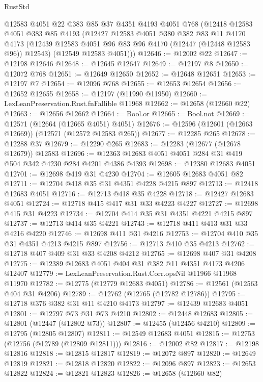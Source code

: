 \begin{lexlean}{RustStd}
\begin{coremodule}
    @12583
    @4051
    @22
    @383
    @85
    @37
    @4351
    @4193
    @4051
    @768
    (@12418
      @12583
      @4051
      @383
      @85
      @4193
      (@12427
        @12583
        @4051
        @380
        @382
        @83
        @11
        @4170
        @4173
        (@12439 @12583 @4051 @96 @83 @96 @4170 (@12447 (@12448 @12583 @96)) @12543)
        (@12549 @12583 @4051)))
@12646 := @12002 @22
@12647 := @12198 @12646
@12648 := @12645 @12647
@12649 := @12197 @8
@12650 := @12072 @768
@12651 := @12649 @12650
@12652 := @12648 @12651
@12653 := @12197 @7
@12654 := @12096 @768
@12655 := @12653 @12654
@12656 := @12652 @12655
@12658 := @12197 (@11990 @11950)
@12660 := LexLeanPreservation.Rust.fnFallible @11968
@12662 := @12658 (@12660 @22)
@12663 := @12656 @12662
@12664 := Bool.or
@12665 := Bool.not
@12669 := @12571 (@12664 (@12665 @4051) @4051)
@12676 := @12596 (@12601 (@12663 @12669)) (@12571 (@12572 @12583 @265))
@12677 := @12285 @265
@12678 := @12288 @37
@12679 := @12290 @265
@12683 := @12283 (@12677 (@12678 @12679)) @12583
@12696 := @12363 @12683 @4051 @4051 @284 @31 @419 @504 @342 @4230 @284 @4201 @4386 @4393
@12698 := @12380 @12683 @4051
@12701 := @12698 @419 @31 @4230
@12704 := @12605 @12683 @4051 @82
@12711 := @12704 @418 @35 @31 @4351 @4228 @4215 @897
@12713 := @12418 @12683 @4051
@12716 := @12713 @418 @35 @4228
@12718 := @12427 @12683 @4051
@12724 := @12718 @415 @417 @31 @33 @4223 @4227
@12727 := @12698 @415 @31 @4223
@12734 := @12704 @414 @35 @31 @4351 @4221 @4215 @897
@12737 := @12713 @414 @35 @4221
@12743 := @12718 @411 @413 @31 @33 @4216 @4220
@12746 := @12698 @411 @31 @4216
@12753 := @12704 @410 @35 @31 @4351 @4213 @4215 @897
@12756 := @12713 @410 @35 @4213
@12762 := @12718 @407 @409 @31 @33 @4208 @4212
@12765 := @12698 @407 @31 @4208
@12775 := @12389 @12683 @4051 @404 @31 @382 @11 @4351 @4173 @4206 @12407
@12779 := LexLeanPreservation.Rust.Corr.opsNil @11966 @11968 @11970
@12782 := @12775 (@12779 @12683 @4051)
@12786 := @12561 (@12563 @404 @31 @4206)
@12789 := @12762 (@12765 (@12782 @12786))
@12795 := @12718 @376 @382 @31 @11 @4210 @4173
@12797 := @12439 @12683 @4051
@12801 := @12797 @73 @31 @73 @4210
@12802 := @12448 @12683
@12805 := @12801 (@12447 (@12802 @73))
@12807 := @12455 (@12456 @4210)
@12809 := @12795 (@12805 @12807)
@12811 := @12549 @12683 @4051
@12815 := @12753 (@12756 (@12789 (@12809 @12811)))
@12816 := @12002 @82
@12817 := @12198 @12816
@12818 := @12815 @12817
@12819 := @12072 @897
@12820 := @12649 @12819
@12821 := @12818 @12820
@12822 := @12096 @897
@12823 := @12653 @12822
@12824 := @12821 @12823
@12826 := @12658 (@12660 @82)

\end{coremodule}
\end{lexlean}
